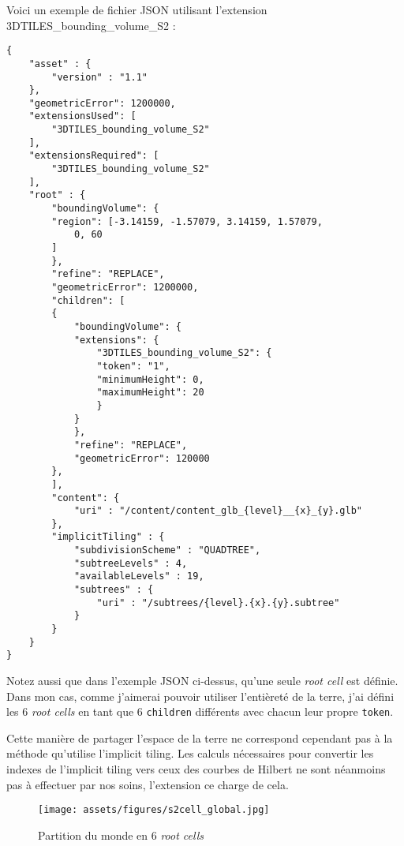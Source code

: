 \newpage

Voici un exemple de fichier JSON utilisant l'extension 3DTILES\_bounding\_volume\_S2 :

\begin{verbatim}
{
    "asset" : {
        "version" : "1.1"
    },
    "geometricError": 1200000,
    "extensionsUsed": [
        "3DTILES_bounding_volume_S2"
    ],
    "extensionsRequired": [
        "3DTILES_bounding_volume_S2"
    ],
    "root" : {
        "boundingVolume": {
        "region": [-3.14159, -1.57079, 3.14159, 1.57079,
            0, 60
        ]
        },
        "refine": "REPLACE",
        "geometricError": 1200000,
        "children": [
        {
            "boundingVolume": {
            "extensions": {
                "3DTILES_bounding_volume_S2": {
                "token": "1",
                "minimumHeight": 0,
                "maximumHeight": 20
                }
            }
            },
            "refine": "REPLACE",
            "geometricError": 120000
        },
        ],
        "content": {
            "uri" : "/content/content_glb_{level}__{x}_{y}.glb"
        },
        "implicitTiling" : {
            "subdivisionScheme" : "QUADTREE",
            "subtreeLevels" : 4,
            "availableLevels" : 19,
            "subtrees" : {
                "uri" : "/subtrees/{level}.{x}.{y}.subtree"
            }
        }
    }
}
\end{verbatim}

\newpage
Notez aussi que dans l'exemple JSON ci-dessus, qu'une seule \textit{root cell} est définie. Dans mon cas, comme j'aimerai pouvoir utiliser l'entièreté de la terre, j'ai défini les 6 \textit{root cells} en tant que 6 \texttt{children} différents avec chacun leur propre \texttt{token}.

Cette manière de partager l'espace de la terre ne correspond cependant pas à la méthode qu'utilise l'implicit tiling. Les calculs nécessaires pour convertir les indexes de l'implicit tiling vers ceux des courbes de Hilbert ne sont néanmoins pas à effectuer par nos soins, l'extension ce charge de cela.

\begin{figure}[H]
    \centering
    \texttt{[image: assets/figures/s2cell\_global.jpg]}
    \caption{Partition du monde en 6 \textit{root cells} \cite{3DTILES_bounding_volume_S2-website}}
    \label{fig:s2-ext}
\end{figure}